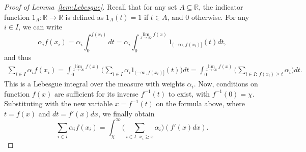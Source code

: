 \begin{proof}[Proof of Lemma~\ref{lem:Lebesgue}]
Recall that for any set $A\subseteq \mathbb{R}$, the indicator function $1_A:\mathbb{R}\rightarrow \mathbb{R}$ is defined as $1_A(t)=1$ if $t\in A$, and $0$ otherwise. For any $i\in I$, we can write
$$\alpha_i f(x_i) = \alpha_i \int_{0}^{f(x_i)} dt = \alpha_i\int_0^{\lim_{x\rightarrow \infty} f(x)} 1_{(-\infty, f(x_i)]}(t)dt,$$
and thus
\begin{align*}
    \sum_{i\in I} \alpha_i f(x_i) = \int_0^{\lim_{x\rightarrow \infty} f(x)} \Big(\sum_{i\in I} \alpha_i 1_{(-\infty, f(x_i)]}(t)\Big)dt = \int_0^{\lim_{x\rightarrow \infty} f(x)} \Big(\sum_{i\in I: \ f(x_i)\geq t} \alpha_i \Big)dt.
\end{align*}
This is a Lebesgue integral over the measure with weights $\alpha_i$. Now, conditions on function $f(x)$ are sufficient for its inverse $f^{-1}(t)$ to exist, with $f^{-1}(0)=\chi$. Substituting with the new variable $x=f^{-1}(t)$ on the formula above, where $t=f(x)$ and $dt=f'(x)dx$, we finally obtain
$$\sum_{i\in I} \alpha_i f(x_i) =\int_{\chi}^{\infty} \Big( \sum_{i\in I: \ x_i\geq x} \alpha_i \Big)(f'(x)dx).$$
\end{proof}


